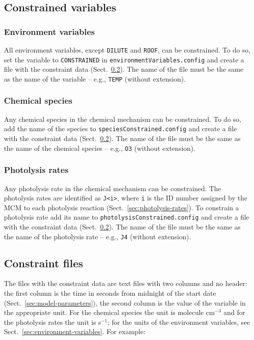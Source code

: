 \subsection{Constrained variables} \label{subsec:constrained-variables}

\subsubsection{Environment variables}

All environment variables, except \texttt{DILUTE} and \texttt{ROOF},
can be constrained. To do so, set the variable to \texttt{CONSTRAINED}
in \texttt{environmentVariables.config} and create a file with the
constraint data (Sect.~\ref{subsec:constraint-files}). The name of the
file must be the same as the name of the variable -- e.g.,
\texttt{TEMP} (without extension).

\subsubsection{Chemical species}

Any chemical species in the chemical mechanism can be constrained. To
do so, add the name of the species to
\texttt{speciesConstrained.config} and create a file with the
constraint data (Sect.~\ref{subsec:constraint-files}). The name of the
file must be the same as the name of the chemical species -- e.g.,
\texttt{O3} (without extension).

\subsubsection{Photolysis rates}

Any photolysis rate in the chemical mechanism can be constrained. The
photolysis rates are identified as \verb|J<i>|, where \texttt{i} is
the ID number assigned by the MCM to each photolysis reaction
(Sect.~\ref{sec:photolysis-rates}). To constrain a photolysis rate add
its name to \texttt{photolysisConstrained.config} and create a file
with the constraint data (Sect.~\ref{subsec:constraint-files}). The
name of the file must be the same as the name of the photolysis rate
-- e.g., \texttt{J4} (without extension).

\subsection{Constraint files} \label{subsec:constraint-files}

The files with the constraint data are text files with two columns and
no header: the first column is the time in seconds from midnight of
the start date (Sect.~\ref{sec:model-parameters}), the second column
is the value of the variable in the appropriate unit. For the chemical
species the unit is molecule cm$^{-3}$ and for the photolysis rates
the unit is s$^{-1}$; for the units of the environment variables, see
Sect.~\ref{sec:environment-variables}. For example:

